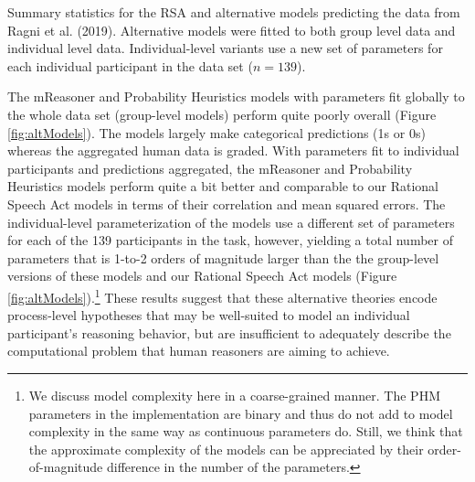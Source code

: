 \documentclass[floatsintext, doc]{apa6}
\begin{document}
\begin{center}
\begin{table}[h]
\centering
{}\caption{Summary statistics for the RSA and alternative models predicting the data from Ragni et al. (2019). Alternative models were fitted to both group level data and individual level data. Individual-level variants use a new set of parameters for each individual participant in the data set ($n=139$).}\label{tab:altStats}
\end{table}
\end{center}


The mReasoner and Probability Heuristics models with parameters fit globally to the whole data set (group-level models) perform quite poorly overall (Figure \ref{fig:altModels}). 
The models largely make categorical predictions (1s or 0s) whereas the aggregated human data is graded.
With parameters fit to individual participants and predictions aggregated, the mReasoner and Probability Heuristics models perform quite a bit better and comparable to our Rational Speech Act models in terms of their correlation and mean squared errors.
The individual-level parameterization of the models use a different set of parameters for each of the 139 participants in the task, however, yielding a total number of parameters that is 1-to-2 orders of magnitude larger than the the group-level versions of these models and our Rational Speech Act models (Figure \ref{fig:altModels}).\footnote{We discuss model complexity here in a coarse-grained manner. The PHM parameters in the  implementation are binary and thus do not add to model complexity in the same way as continuous parameters do. Still, we think that the approximate complexity of the models can be appreciated by their order-of-magnitude difference in the number of the parameters.}
These results suggest that these alternative theories encode process-level hypotheses that may be well-suited to model an individual participant's reasoning behavior, but are insufficient to adequately describe the computational problem that human reasoners are aiming to achieve. 
\end{document}
